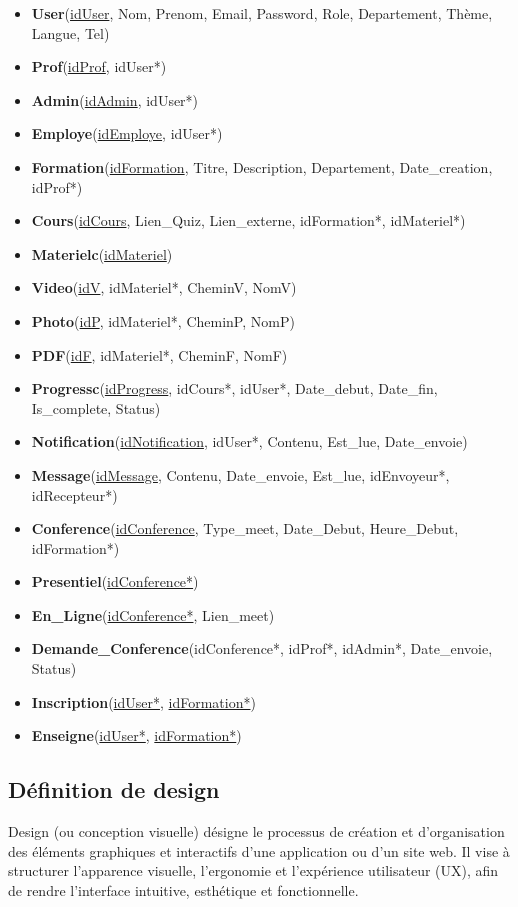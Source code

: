 \documentclass{article}
\begin{document}
\begin{itemize}
  \item[] \textbf{User}(\underline{idUser}, Nom, Prenom, Email, Password, Role, Departement, Thème, Langue, Tel)
  \item[] \textbf{Prof}(\underline{idProf}, idUser*)
  \item[] \textbf{Admin}(\underline{idAdmin}, idUser*)
  \item[] \textbf{Employe}(\underline{idEmploye}, idUser*)
  \item[] \textbf{Formation}(\underline{idFormation}, Titre, Description, Departement, Date\_creation, idProf*)
  \item[] \textbf{Cours}(\underline{idCours}, Lien\_Quiz, Lien\_externe, idFormation*, idMateriel*)
  \item[] \textbf{Materielc}(\underline{idMateriel})
  \item[] \textbf{Video}(\underline{idV}, idMateriel*, CheminV, NomV)
  \item[] \textbf{Photo}(\underline{idP}, idMateriel*, CheminP, NomP)
  \item[] \textbf{PDF}(\underline{idF}, idMateriel*, CheminF, NomF)
  \item[] \textbf{Progressc}(\underline{idProgress}, idCours*, idUser*, Date\_debut, Date\_fin, Is\_complete, Status)
  \item[] \textbf{Notification}(\underline{idNotification}, idUser*, Contenu, Est\_lue, Date\_envoie)
  \item[] \textbf{Message}(\underline{idMessage}, Contenu, Date\_envoie, Est\_lue, idEnvoyeur*, idRecepteur*)
  \item[] \textbf{Conference}(\underline{idConference}, Type\_meet, Date\_Debut, Heure\_Debut, idFormation*)
  \item[] \textbf{Presentiel}(\underline{idConference*})
  \item[] \textbf{En\_Ligne}(\underline{idConference*}, Lien\_meet)
  \item[] \textbf{Demande\_Conference}(idConference*, idProf*, idAdmin*, Date\_envoie, Status)
  \item[] \textbf{Inscription}(\underline{idUser*}, \underline{idFormation*})
  \item[] \textbf{Enseigne}(\underline{idUser*}, \underline{idFormation*})
\end{itemize}


\vspace{0.6cm}


\subsection{Définition de design}
\hspace*{2em}Design (ou conception visuelle) désigne le processus de création et d’organisation des éléments graphiques et interactifs d’une application ou d’un site web. Il vise à structurer l’apparence visuelle, l’ergonomie et l’expérience utilisateur (UX), afin de rendre l’interface intuitive, esthétique et fonctionnelle.
\end{document}
